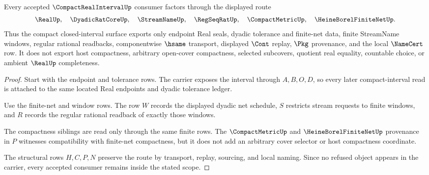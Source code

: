 \begin{theorem}
\label{thm:compact-real-interval-namecert-scope}
Every accepted $\CompactRealIntervalUp$ consumer factors through the displayed route
$$
\RealUp,\quad
\DyadicRatCoreUp,\quad
\StreamNameUp,\quad
\RegSeqRatUp,\quad
\CompactMetricUp,\quad
\HeineBorelFiniteNetUp .
$$
Thus the compact closed-interval surface exports only endpoint Real seals, dyadic tolerance and finite-net data, finite StreamName windows, regular rational readbacks, componentwise $\hsame$ transport, displayed $\Cont$ replay, $\Pkg$ provenance, and the local $\NameCert$ row. It does not export host compactness, arbitrary open-cover compactness, selected subcovers, quotient real equality, countable choice, or ambient $\RealUp$ completeness.
\end{theorem}
\begin{proof}
Start with the endpoint and tolerance rows. The carrier exposes the interval through $A,B,O,D$, so every later compact-interval read is attached to the same located Real endpoints and dyadic tolerance ledger.

Use the finite-net and window rows. The row $W$ records the displayed dyadic net schedule, $S$ restricts stream requests to finite windows, and $R$ records the regular rational readback of exactly those windows.

The compactness siblings are read only through the same finite rows. The $\CompactMetricUp$ and $\HeineBorelFiniteNetUp$ provenance in $P$ witnesses compatibility with finite-net compactness, but it does not add an arbitrary cover selector or host compactness coordinate.

The structural rows $H,C,P,N$ preserve the route by transport, replay, sourcing, and local naming. Since no refused object appears in the carrier, every accepted consumer remains inside the stated scope.
\end{proof}

